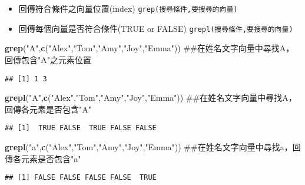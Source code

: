 \documentclass[]{book}
\newenvironment{Shaded}{\begin{snugshade}}{\end{snugshade}}
\newcommand{\KeywordTok}[1]{\textcolor[rgb]{0.13,0.29,0.53}{\textbf{{#1}}}}
\newcommand{\StringTok}[1]{\textcolor[rgb]{0.31,0.60,0.02}{{#1}}}
\newcommand{\NormalTok}[1]{{#1}}
\providecommand{\tightlist}{%
  \setlength{\itemsep}{0pt}\setlength{\parskip}{0pt}}
\begin{document}
\begin{itemize}
\tightlist
\item
  回傳符合條件之向量位置(index) \texttt{grep(搜尋條件,要搜尋的向量)}
\item
  回傳每個向量是否符合條件(TRUE or FALSE)
  \texttt{grepl(搜尋條件,要搜尋的向量)}
\end{itemize}

\begin{Shaded}
\begin{Highlighting}[]
\KeywordTok{grep}\NormalTok{(}\StringTok{"A"}\NormalTok{,}\KeywordTok{c}\NormalTok{(}\StringTok{"Alex"}\NormalTok{,}\StringTok{"Tom"}\NormalTok{,}\StringTok{"Amy"}\NormalTok{,}\StringTok{"Joy"}\NormalTok{,}\StringTok{"Emma"}\NormalTok{)) ##在姓名文字向量中尋找A，回傳包含"A"之元素位置}
\end{Highlighting}
\end{Shaded}

\begin{verbatim}
## [1] 1 3
\end{verbatim}

\begin{Shaded}
\begin{Highlighting}[]
\KeywordTok{grepl}\NormalTok{(}\StringTok{"A"}\NormalTok{,}\KeywordTok{c}\NormalTok{(}\StringTok{"Alex"}\NormalTok{,}\StringTok{"Tom"}\NormalTok{,}\StringTok{"Amy"}\NormalTok{,}\StringTok{"Joy"}\NormalTok{,}\StringTok{"Emma"}\NormalTok{)) ##在姓名文字向量中尋找A，回傳各元素是否包含"A"}
\end{Highlighting}
\end{Shaded}

\begin{verbatim}
## [1]  TRUE FALSE  TRUE FALSE FALSE
\end{verbatim}

\begin{Shaded}
\begin{Highlighting}[]
\KeywordTok{grepl}\NormalTok{(}\StringTok{"a"}\NormalTok{,}\KeywordTok{c}\NormalTok{(}\StringTok{"Alex"}\NormalTok{,}\StringTok{"Tom"}\NormalTok{,}\StringTok{"Amy"}\NormalTok{,}\StringTok{"Joy"}\NormalTok{,}\StringTok{"Emma"}\NormalTok{)) ##在姓名文字向量中尋找a，回傳各元素是否包含"a"}
\end{Highlighting}
\end{Shaded}

\begin{verbatim}
## [1] FALSE FALSE FALSE FALSE  TRUE
\end{verbatim}
\end{document}
